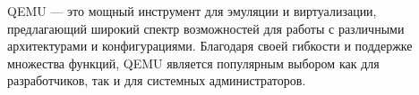     QEMU — это мощный инструмент для эмуляции и виртуализации, предлагающий широкий спектр возможностей для работы с различными архитектурами и конфигурациями. Благодаря своей гибкости и поддержке множества функций, QEMU является популярным выбором как для разработчиков, так и для системных администраторов.

\endinput